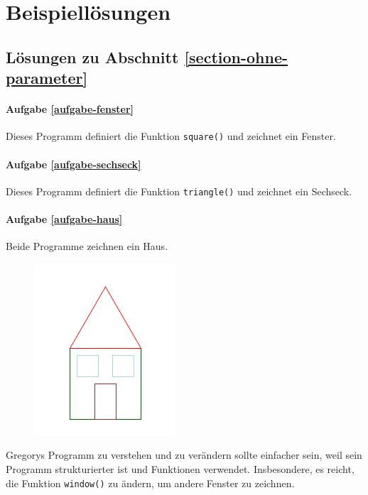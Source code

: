 \documentclass{article}
\begin{document}
\newpage

\section*{Beispiellösungen}

\subsection*{Lösungen zu Abschnitt \ref{section-ohne-parameter}}

\paragraph{Aufgabe \ref{aufgabe-fenster}}
Dieses Programm definiert die Funktion \lstinline|square()| und zeichnet ein Fenster.


\paragraph{Aufgabe \ref{aufgabe-sechseck}} 
Dieses Programm definiert die Funktion \lstinline|triangle()| und zeichnet ein Sechseck.


\paragraph{Aufgabe \ref{aufgabe-haus}} 
Beide Programme zeichnen ein Haus.
\begin{figure}[H]
\centering
\includegraphics[width=0.3\linewidth]{pictures/picture-haus.png}
\end{figure}
Gregorys Programm zu verstehen und zu verändern sollte einfacher sein, weil sein Programm strukturierter ist und Funktionen verwendet. Insbesondere, es reicht, die Funktion \lstinline|window()| zu ändern, um andere Fenster zu zeichnen.


\end{document}

